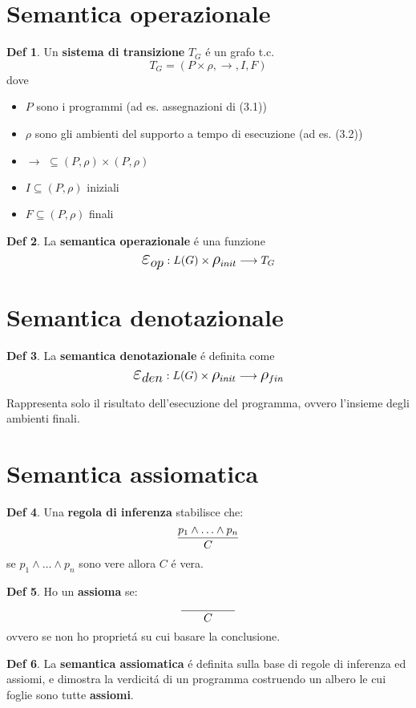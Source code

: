 \documentclass[a4paper]{report}
\theoremstyle{definition} \newtheorem*{defi}{Def}
\theoremstyle{plain} \newtheorem{lemma}{Lemma}
\theoremstyle{plain} \newtheorem{teo}{Teorema}
\theoremstyle{remark} \newtheorem*{es}{Esempio}
\DeclareRobustCommand{\frac}[3][0pt]{%
  {\begingroup\hspace{#1}#2\hspace{#1}\endgroup\over\hspace{#1}#3\hspace{#1}}}
\begin{document}
\section{Semantica operazionale}
\begin{defi}
	Un {\bf sistema di transizione} $T_G$ \'e un grafo t.c.
	$$
	T_G = ( P \times \rho , \longrightarrow , I , F  )
	$$
	dove
	\begin{itemize}
		\item $P$ sono i programmi (ad es. assegnazioni di (3.1))
		\item $\rho$ sono gli ambienti del supporto a tempo di esecuzione (ad es. (3.2))
		\item $ \longrightarrow \, \, \subseteq ( P , \rho ) \times ( P , \rho ) $
		\item $ I \subseteq ( P,\rho)$ iniziali
		\item $ F \subseteq (P, \rho)$ finali
	\end{itemize}
\end{defi}
\begin{defi}
	La {\bf semantica operazionale} \'e una funzione
	$$
	\mathlarger{\mathlarger{\mathlarger{\varepsilon_{op}}}} : L(G) \times \mathlarger{\mathlarger{\rho}}_{init} \longrightarrow T_G
	$$
\end{defi}

\section{Semantica denotazionale}
\begin{defi}
	La {\bf semantica denotazionale} \'e definita come
	$$
	\mathlarger{\mathlarger{\mathlarger{\varepsilon_{den}}}} : L(G) \times \mathlarger{\mathlarger{\rho}}_{init} \longrightarrow \mathlarger{\mathlarger{\rho}}_{fin}
	$$
\end{defi}
Rappresenta solo il risultato dell'esecuzione del programma, ovvero l'insieme degli ambienti finali.

\section{Semantica assiomatica}
\begin{defi}
	Una {\bf regola di inferenza} stabilisce che:
	$$
	\frac{p_1 \wedge \ldots \wedge p_n}{C}
	$$
	se $ p_1 \wedge \ldots \wedge p_n $ sono vere allora $C$ \'e vera.
\end{defi}
\begin{defi}
	Ho un {\bf assioma} se:
	$$
	\frac[20pt]{}{C}
	$$
	ovvero se non ho propriet\'a su cui basare la conclusione.
\end{defi}
\begin{defi}
	La {\bf semantica assiomatica} \'e definita sulla base di regole di inferenza ed assiomi, e dimostra la verdicit\'a di un programma costruendo un albero le cui foglie sono tutte {\bf assiomi}.
\end{defi}
\end{document}
